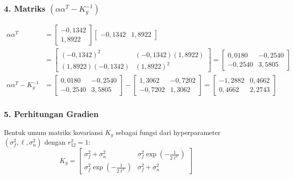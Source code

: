 \documentclass[11pt,a4paper]{article}
\def\boldsymbol#1{#1}%
\begin{document}
\subsubsection*{4. Matriks \texorpdfstring{$(\boldsymbol{\alpha}\boldsymbol{\alpha}^T - K_y^{-1})$}{(alpha alpha^T - Ky^(-1))}}
\begin{align}
\boldsymbol{\alpha}\boldsymbol{\alpha}^T &= \begin{bmatrix} -0{,}1342 \\ 1{,}8922 \end{bmatrix} \begin{bmatrix} -0{,}1342 & 1{,}8922 \end{bmatrix} \nonumber \\
&= \begin{bmatrix} (-0{,}1342)^2 & (-0{,}1342)(1{,}8922) \\ (1{,}8922)(-0{,}1342) & (1{,}8922)^2 \end{bmatrix} = \begin{bmatrix} 0{,}0180 & -0{,}2540 \\ -0{,}2540 & 3{,}5805 \end{bmatrix} \\
\boldsymbol{\alpha}\boldsymbol{\alpha}^T - K_y^{-1} &= \begin{bmatrix} 0{,}0180 & -0{,}2540 \\ -0{,}2540 & 3{,}5805 \end{bmatrix} - \begin{bmatrix} 1{,}3062 & -0{,}7202 \\ -0{,}7202 & 1{,}3062 \end{bmatrix} = \begin{bmatrix} -1{,}2882 & 0{,}4662 \\ 0{,}4662 & 2{,}2743 \end{bmatrix}
\end{align}

\subsubsection*{5. Perhitungan Gradien}
\noindent Bentuk umum matriks kovariansi $K_y$ sebagai fungsi dari hyperparameter $(\sigma_f^2, \ell, \sigma_n^2)$ dengan $r_{12}^2 = 1$:
\begin{equation}
K_y = \begin{bmatrix} \sigma_f^2 + \sigma_n^2 & \sigma_f^2 \exp\left(-\frac{1}{2\ell^2}\right) \\[0.4em] \sigma_f^2 \exp\left(-\frac{1}{2\ell^2}\right) & \sigma_f^2 + \sigma_n^2 \end{bmatrix}
\end{equation}
\end{document}

